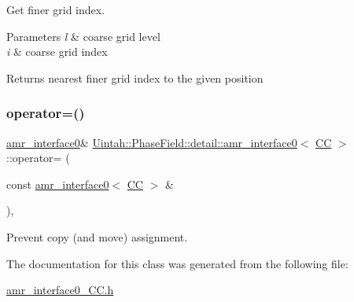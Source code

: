 Get finer grid index. 


\begin{DoxyParams}{Parameters}
{\em l} & coarse grid level \\
\hline
{\em i} & coarse grid index \\
\hline
\end{DoxyParams}
\begin{DoxyReturn}{Returns}
nearest finer grid index to the given position 
\end{DoxyReturn}
\mbox{\label{classUintah_1_1PhaseField_1_1detail_1_1amr__interface0_3_01CC_01_4_a31ce6d17e902abe712165f395a8d1ffb}} 
\subsubsection{\texorpdfstring{operator=()}{operator=()}}
{\footnotesize\ttfamily \hyperlink{classUintah_1_1PhaseField_1_1detail_1_1amr__interface0}{amr\+\_\+interface0}\& \hyperlink{classUintah_1_1PhaseField_1_1detail_1_1amr__interface0}{Uintah\+::\+Phase\+Field\+::detail\+::amr\+\_\+interface0}$<$ \hyperlink{namespaceUintah_1_1PhaseField_a33d355affda78a83f45755ba8388cedda22303704507d024d1d6508ed9859a85a}{CC} $>$\+::operator= (\begin{DoxyParamCaption}\item[{const \hyperlink{classUintah_1_1PhaseField_1_1detail_1_1amr__interface0}{amr\+\_\+interface0}$<$ \hyperlink{namespaceUintah_1_1PhaseField_a33d355affda78a83f45755ba8388cedda22303704507d024d1d6508ed9859a85a}{CC} $>$ \&}]{ }\end{DoxyParamCaption})\hspace{0.3cm}{\ttfamily [protected]}, {\ttfamily [delete]}}



Prevent copy (and move) assignment. 



The documentation for this class was generated from the following file\+:\begin{DoxyCompactItemize}
\item 
\hyperlink{amr__interface0__CC_8h}{amr\+\_\+interface0\+\_\+\+C\+C.\+h}\end{DoxyCompactItemize}

